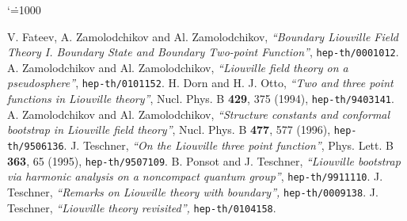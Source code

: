 \documentclass[a4paper,11pt]{article}
\begin{document}
     {\settowidth{}\leftmargin{}
      \advance\leftmargin{}}
\def\newblock{\hskip .11em plus .33em minus .07em}
\sloppy{}
\sfcode`\.=1000\relax
\let\endthebibliography=\endlist


 V. Fateev, A. Zamolodchikov and Al. Zamolodchikov,
    {\sl ``Boundary Liouville Field Theory I.
           Boundary State and Boundary Two-point Function''},
    {\tt hep-th/0001012}.
 A. Zamolodchikov and Al. Zamolodchikov,
    {\sl ``Liouville field theory on a pseudosphere''},
    {\tt hep-th/0101152}.
 H. Dorn and H. J. Otto,
    {\sl ``Two and three point functions in Liouville theory''},
    Nucl. Phys. B {\bf 429}, 375 (1994), {\tt hep-th/9403141}.
 A. Zamolodchikov and Al. Zamolodchikov,
    {\sl ``Structure constants and conformal bootstrap
           in Liouville field theory''},
    Nucl. Phys. B {\bf 477}, 577 (1996), {\tt hep-th/9506136}.
 J. Teschner,
    {\sl ``On the Liouville three point function''},
    Phys. Lett. B {\bf 363}, 65 (1995), {\tt hep-th/9507109}.
 B. Ponsot and J. Teschner,
    {\sl ``Liouville bootstrap via harmonic analysis
           on a noncompact quantum group''},
    {\tt hep-th/9911110}.
 J. Teschner,
    {\sl ``Remarks on Liouville theory with boundary'',}
    {\tt hep-th/0009138}.
 J. Teschner,
    {\sl ``Liouville theory revisited'',}
    {\tt hep-th/0104158}.
\end{document}
